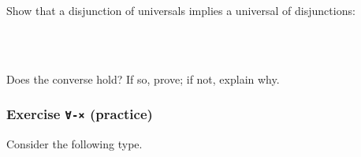 Show that a disjunction of universals implies a universal of
disjunctions:

\begin{fence}
\begin{code}%
\>[0]\<%
\\
\>[0][@{}l@{\AgdaIndent{0}}]%
\>[2]\AgdaSpace{}%
\AgdaSymbol{:}\AgdaSpace{}%
\AgdaSpace{}%
\AgdaSymbol{\{}\AgdaSpace{}%
\AgdaSymbol{:}\AgdaSpace{}%
\AgdaSymbol{\}}\AgdaSpace{}%
\AgdaSymbol{\{}\AgdaSpace{}%
\AgdaSpace{}%
\AgdaSymbol{:}\AgdaSpace{}%
\AgdaSpace{}%
\AgdaSpace{}%
\AgdaSymbol{\}}\AgdaSpace{}%
\<%
\\
\>[2][@{}l@{\AgdaIndent{0}}]%
\>[4]\AgdaSpace{}%
\AgdaSymbol{(}\AgdaSpace{}%
\AgdaSymbol{:}\AgdaSpace{}%
\AgdaSymbol{)}\AgdaSpace{}%
\AgdaSpace{}%
\AgdaSpace{}%
\AgdaSymbol{)}\AgdaSpace{}%
\AgdaSpace{}%
\AgdaSpace{}%
\AgdaSymbol{(}\AgdaSpace{}%
\AgdaSymbol{:}\AgdaSpace{}%
\AgdaSymbol{)}\AgdaSpace{}%
\AgdaSpace{}%
\AgdaSpace{}%
\AgdaSymbol{)}%
\>[43]%
\>[46]\AgdaSpace{}%
\AgdaSymbol{(}\AgdaSpace{}%
\AgdaSymbol{:}\AgdaSpace{}%
\AgdaSymbol{)}\AgdaSpace{}%
\AgdaSpace{}%
\AgdaSpace{}%
\AgdaSpace{}%
\AgdaSpace{}%
\AgdaSpace{}%
\<%
\end{code}
\end{fence}

Does the converse hold? If so, prove; if not, explain why.

\hypertarget{exercise---practice}{%
\subsubsection{\texorpdfstring{Exercise \texttt{∀-×}
(practice)}{Exercise ∀-× (practice)}}\label{exercise---practice}}

Consider the following type.

\begin{fence}
\begin{code}%
\>[0]\AgdaSpace{}%
\AgdaSpace{}%
\AgdaSymbol{:}\AgdaSpace{}%
\AgdaSpace{}%
\<%
\\
\>[0][@{}l@{\AgdaIndent{0}}]%
\>[2]\AgdaSpace{}%
\AgdaSymbol{:}\AgdaSpace{}%
\<%
\\
%
\>[2]\AgdaSpace{}%
\AgdaSymbol{:}\AgdaSpace{}%
\<%
\\
%
\>[2]\AgdaSpace{}%
\AgdaSymbol{:}\AgdaSpace{}%
\<%
\end{code}
\end{fence}

